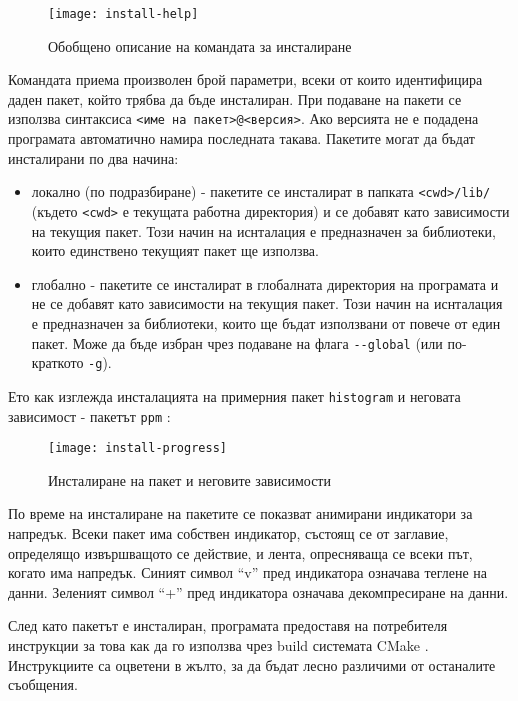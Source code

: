 \begin{figure}[h]
    \centering
    \texttt{[image: install-help]}
    \caption{Обобщено описание на командата за инсталиране}
    \label{fig:install-help}
\end{figure}

Командата приема произволен брой параметри, всеки от които идентифицира даден
пакет, който трябва да бъде инсталиран. При подаване на пакети се използва
синтаксиса \texttt{<име на пакет>@<версия>}. Ако версията не е подадена
програмата автоматично намира последната такава. Пакетите могат да бъдат
инсталирани по два начина:

\begin{itemize}
    \item локално (по подразбиране) - пакетите се инсталират в папката
          \texttt{<cwd>/lib/} (където \texttt{<cwd>} е текущата работна
          директория) и се добавят като зависимости на текущия пакет.
          Този начин на иснталация е предназначен за библиотеки, които
          единствено текущият пакет ще използва.
    \item глобално - пакетите се инсталират в глобалната директория на
          програмата и не се добавят като зависимости на текущия пакет. Този
          начин на иснталация е предназначен за библиотеки, които ще бъдат
          използвани от повече от един пакет. Може да бъде избран чрез подаване
          на флага \texttt{-{}-global} (или по-краткото \texttt{-g}).
\end{itemize}

Ето как изглежда инсталацията на примерния пакет \texttt{histogram} и неговата
зависимост - пакетът \texttt{ppm} :

\begin{figure}[H]
    \centering
    \texttt{[image: install-progress]}
    \caption{Инсталиране на пакет и неговите зависимости}
    \label{fig:install-progress}
\end{figure}

По време на инсталиране на пакетите се показват анимирани индикатори за
напредък. Всеки пакет има собствен индикатор, състоящ се от заглавие, определящо
извършващото се действие, и лента, опресняваща се всеки път, когато има
напредък. Синият символ ``v'' пред индикатора означава теглене на данни.
Зеленият символ ``+'' пред индикатора означава декомпресиране на данни.

След като пакетът е инсталиран, програмата предоставя на потребителя инструкции
за това как да го използва чрез build системата CMake .
Инструкциите са оцветени в жълто, за да бъдат лесно различими от останалите
съобщения.

